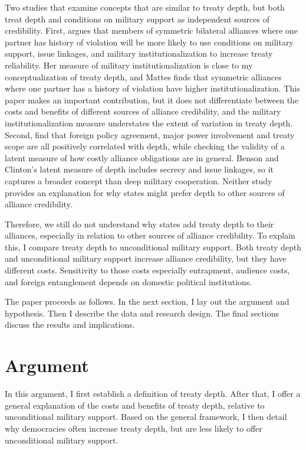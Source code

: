 \documentclass[12pt]{article}
\begin{document}
Two studies that examine concepts that are similar to treaty depth, but both treat depth and conditions on military support as independent sources of credibility.   
First, \citet{Mattes2012} argues that members of symmetric bilateral alliances where one partner has history of violation will be more likely to use conditions on military support, issue linkages, and military institutionalization to increase treaty reliability. 
Her measure of military institutionalization \citep{LeedsAnac2005} is close to my conceptualization of treaty depth, and Mattes finds that symmetric alliances where one partner has a history of violation have higher institutionalization.
This paper makes an important contribution, but it does not differentiate between the costs and benefits of different sources of alliance credibility, and the military institutionalization measure understates the extent of variation in treaty depth.  
Second, \citet{BensonClinton2016} find that foreign policy agreement, major power involvement and treaty scope are all positively correlated with depth, while checking the validity of a latent measure of how costly alliance obligations are in general. 
Benson and Clinton's latent measure of depth includes secrecy and issue linkages, so it captures a broader concept than deep military cooperation. 
Neither study provides an explanation for why states might prefer depth to other sources of alliance credibility. 


Therefore, we still do not understand why states add treaty depth to their alliances, especially in relation to other sources of alliance credibility. 
To explain this, I compare treaty depth to unconditional military support.  
Both treaty depth and unconditional military support increase alliance credibility, but they have different costs.
Sensitivity to those costs especially entrapment, audience costs, and foreign entanglement depends on domestic political institutions. 


The paper proceeds as follows. 
In the next section, I lay out the argument and hypothesis. 
Then I describe the data and research design. 
The final sections discuss the results and implications. 


\section{Argument}


In this argument, I first establish a definition of treaty depth.  
After that, I offer a general explanation of the costs and benefits of treaty depth, relative to unconditional military support. 
Based on the general framework, I then detail why democracies often increase treaty depth, but are less likely to offer unconditional military support. 
\end{document}

